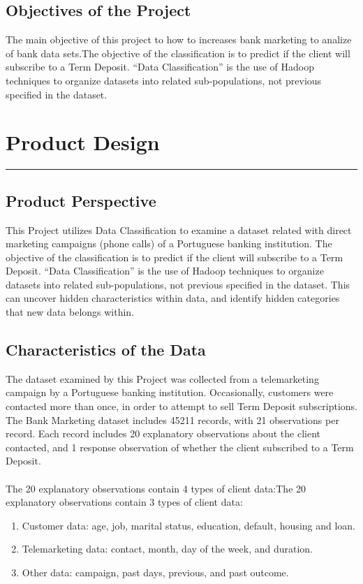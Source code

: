 \section{Objectives of the Project }
The main objective of this project to how to increases bank marketing to analize of bank data sets.The objective of the classification is to predict if the client will subscribe to a Term Deposit. “Data Classification” is the use of Hadoop techniques to organize datasets into related sub-populations, not previous specified in the dataset.




\chapter{Product Design}\hrule
\label{Chapter:3}

\section{Product Perspective}
This Project utilizes Data Classification to examine a dataset related with direct marketing campaigns (phone calls) of a Portuguese banking institution. The objective of the classification is to predict if the client will subscribe to a Term Deposit. “Data Classification” is the use of Hadoop techniques to organize datasets into related sub-populations, not previous specified in the dataset. This can uncover hidden characteristics within data, and identify hidden categories that new data belongs within.
\section{Characteristics of the Data}
The dataset examined by this Project was collected from a telemarketing campaign by a Portuguese banking institution. Occasionally, customers were contacted more than once, in order to attempt to sell Term Deposit subscriptions. The Bank Marketing dataset includes 45211 records, with 21 observations per record. Each record includes 20 explanatory observations about the client contacted, and 1 response observation of whether the client subscribed to a Term Deposit.
\\
\\
The 20 explanatory observations contain 4 types of client data:The 20 explanatory observations contain 3 types of client data:
\begin{enumerate}
	\item Customer data: age, job, marital status, education, default, housing and loan.
	\item Telemarketing data: contact, month, day of the week, and duration.
	\item Other data: campaign, past days, previous, and past outcome.
\end{enumerate}
